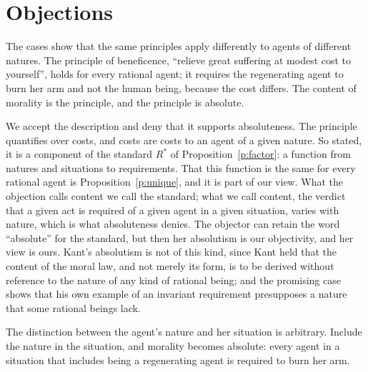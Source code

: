 \documentclass{situationist-preprint}
\begin{document}
\section{Objections}

\begin{objection}\label{o:principle}
The cases show that the same principles apply differently to agents of different natures. The principle of beneficence, \enquote{relieve great suffering at modest cost to yourself}, holds for every rational agent; it requires the regenerating agent to burn her arm and not the human being, because the cost differs. The content of morality is the principle, and the principle is absolute.
\end{objection}

\begin{reply}
We accept the description and deny that it supports absoluteness. The principle quantifies over costs, and costs are costs to an agent of a given nature. So stated, it is a component of the standard $R^*$ of Proposition~\ref{p:factor}: a function from natures and situations to requirements. That this function is the same for every rational agent is Proposition~\ref{p:unique}, and it is part of our view. What the objection calls content we call the standard; what we call content, the verdict that a given act is required of a given agent in a given situation, varies with nature, which is what absoluteness denies. The objector can retain the word \enquote{absolute} for the standard, but then her absolutism is our objectivity, and her view is ours. Kant's absolutism is not of this kind, since Kant held that the content of the moral law, and not merely its form, is to be derived without reference to the nature of any kind of rational being; and the promising case shows that his own example of an invariant requirement presupposes a nature that some rational beings lack.
\end{reply}

\begin{objection}
The distinction between the agent's nature and her situation is arbitrary. Include the nature in the situation, and morality becomes absolute: every agent in a situation that includes being a regenerating agent is required to burn her arm.
\end{objection}
\end{document}
